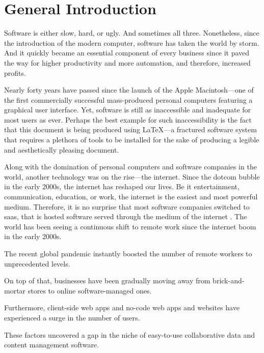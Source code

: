\chapter*{General Introduction}

Software is either slow, hard, or ugly.
And sometimes all three.
Nonetheless, since the introduction of the modern computer, software has taken the world by storm.
And it quickly became an essential component of every business since it paved the way for higher productivity and more automation, and therefore, increased profits.

Nearly forty years \parencite{noauthor_macintosh_2010} have passed since the launch of the Apple Macintosh---one of the first commercially successful \parencite{polsson_chronology_2009} mass-produced personal computers featuring a graphical user interface.
Yet, software is still as inaccessible and inadequate for most users as ever.
Perhaps the best example for such inaccessibility is the fact that this document is being produced using \LaTeX---a fractured software system that requires a plethora of tools to be installed for the sake of producing a legible and aesthetically pleasing document.

Along with the domination of personal computers and software companies in the world, another technology was on the rise---the internet. Since the dotcom bubble in the early 2000s, the internet has reshaped our lives.
Be it entertainment, communication, education, or work, the internet is the easiest and most powerful medium.
Therefore, it is no surprise that most software companies switched to \acrfull{saas}, that is hosted software served through the medium of the internet \cite{december_2019_what_nodate}.
The world has been seeing a continuous shift to remote work since the internet boom in the early 2000s.

The recent global pandemic instantly boosted the number of remote workers to unprecedented levels.

On top of that, businesses have been gradually moving away from brick-and-mortar stores to online software-managed ones.

Furthermore, client-side web apps and no-code web apps and websites have experienced a surge in the number of users.

These factors uncovered a gap in the niche of easy-to-use collaborative data and content management software.